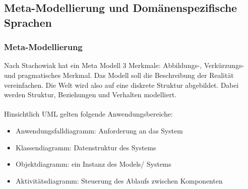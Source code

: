 
\subsection{Meta-Modellierung und Domänenspezifische Sprachen}

\subsubsection{Meta-Modellierung}

Nach Stachowiak hat ein Meta Modell 3 Merkmale: Abbildungs-, Verkürzungs- und pragmatisches Merkmal.
Das Modell soll die Beschreibung der Realität vereinfachen.
Die Welt wird also auf eine diskrete Struktur abgebildet.
Dabei werden Struktur, Beziehungen und Verhalten modelliert.
\\ \\
Hinsichtlich UML gelten folgende Anwendungsbereiche:
\begin{itemize}
    \item Anwendungsfalldiagramm: Anforderung an das System
    \item Klassendiagramm: Datenstruktur des Systems
    \item Objektdiagramm: ein Instanz des Models/ Systems
    \item Aktivitätsdiagramm: Steuerung des Ablaufs zwischen Komponenten
\end{itemize}
